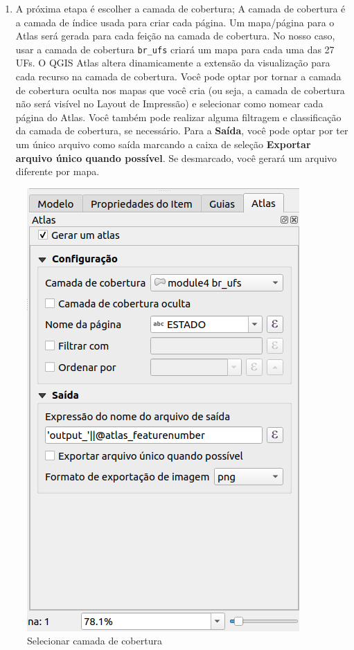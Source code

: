 \documentclass[
]{book}
\providecommand{\tightlist}{%
  \setlength{\itemsep}{0pt}\setlength{\parskip}{0pt}}
\begin{document}
\begin{enumerate}
\def\labelenumi{\arabic{enumi}.}
\setcounter{enumi}{2}
\tightlist
\item
  A próxima etapa é escolher a camada de cobertura; A camada de cobertura é a camada de índice usada para criar cada página. Um mapa/página para o Atlas será gerada para cada feição na camada de cobertura. No nosso caso, usar a camada de cobertura \texttt{br\_ufs} criará um mapa para cada uma das 27 UFs. O QGIS Atlas altera dinamicamente a extensão da visualização para cada recurso na camada de cobertura. Você pode optar por tornar a camada de cobertura oculta nos mapas que você cria (ou seja, a camada de cobertura não será visível no Layout de Impressão) e selecionar como nomear cada página do Atlas. Você também pode realizar alguma filtragem e classificação da camada de cobertura, se necessário. Para a \textbf{Saída}, você pode optar por ter um único arquivo como saída marcando a caixa de seleção \textbf{Exportar arquivo único quando possível}. Se desmarcado, você gerará um arquivo diferente por mapa.
\end{enumerate}

\begin{figure}
\centering
\includegraphics{media/modulo5/coverage-layer.png}
\caption{Selecionar camada de cobertura}
\end{figure}
\end{document}
